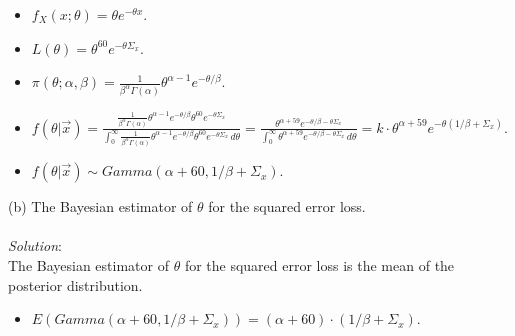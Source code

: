 \documentclass[12pt]{article}
\newcommand{\ds}{\displaystyle}
\begin{document}
\begin{itemize} 
    \item $ \ds f_X(x ; \theta) = \theta e^{-\theta x} $. \\
    \item $ \ds L(\theta) = \theta^{60} e^{-\theta\Sigma_{x}} $. \\
    \item $ \ds \pi(\theta ; \alpha, \beta) = \frac{ 1 }{ \beta^{\alpha} \Gamma(\alpha) } \theta^{\alpha - 1} e^{-\theta / \beta} $. \\
    \item $ \ds f(\theta | \overrightarrow{x}) = \frac{ \ds \frac{ 1 }{ \beta^{\alpha} \Gamma(\alpha) } \theta^{\alpha - 1} e^{-\theta / \beta} \theta^{60} e^{-\theta\Sigma_{x}} }{ \ds \int_{0}^{\infty} \frac{ 1 }{ \beta^{\alpha} \Gamma(\alpha) } \theta^{\alpha - 1} e^{-\theta / \beta} \theta^{60} e^{-\theta\Sigma_{x}} \, d\theta } = 
    \frac{ \ds \theta^{\alpha + 59} e^{-\theta / \beta - \theta\Sigma_{x}} }{ \ds \int_{0}^{\infty} \theta^{\alpha + 59} e^{-\theta / \beta - \theta\Sigma_{x}} \, d\theta } = k \cdot \theta^{\alpha + 59} e^{-\theta( 1 / \beta + \Sigma_{x})} $. \\
    \item $ \ds f(\theta | \overrightarrow{x}) \sim Gamma(\alpha + 60, 1 / \beta + \Sigma_{x}) $. \\
\end{itemize} 

\newpage

\vspace{2.5mm}

(b) The Bayesian estimator of $ \theta $ for the squared error loss. \\
\vspace{2.5mm} \\
\textit{Solution}:
\vspace{2.5mm} \\

\noindent
The Bayesian estimator of $ \theta $ for the squared error loss is the mean of the posterior distribution. \\

\begin{itemize}
    \item $ \ds E(Gamma(\alpha + 60, 1 / \beta + \Sigma_{x})) = (\alpha + 60) \cdot (1 / \beta + \Sigma_{x}) $.
\end{itemize}
\end{document}
